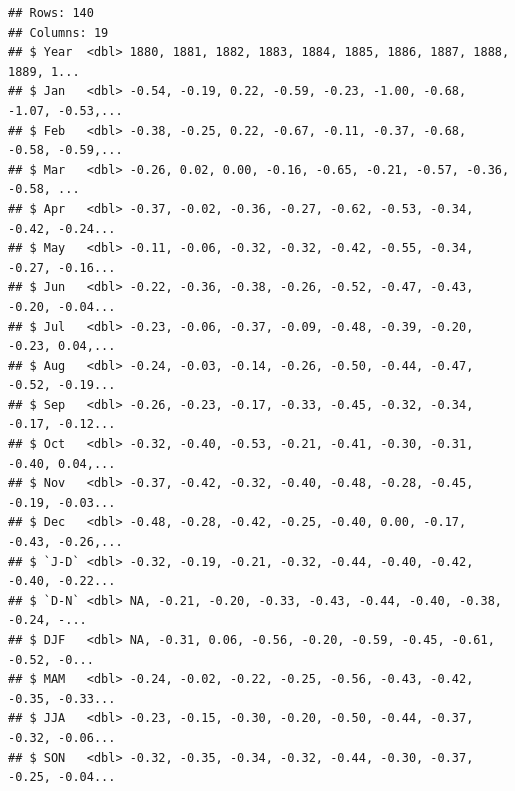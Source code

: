 \documentclass[
]{article}
\newenvironment{Shaded}{\begin{snugshade}}{\end{snugshade}}
\newcommand{\CommentTok}[1]{\textcolor[rgb]{0.56,0.35,0.01}{\textit{#1}}}
\newcommand{\DataTypeTok}[1]{\textcolor[rgb]{0.13,0.29,0.53}{#1}}
\newcommand{\DecValTok}[1]{\textcolor[rgb]{0.00,0.00,0.81}{#1}}
\newcommand{\KeywordTok}[1]{\textcolor[rgb]{0.13,0.29,0.53}{\textbf{#1}}}
\newcommand{\NormalTok}[1]{#1}
\newcommand{\OperatorTok}[1]{\textcolor[rgb]{0.81,0.36,0.00}{\textbf{#1}}}
\newcommand{\StringTok}[1]{\textcolor[rgb]{0.31,0.60,0.02}{#1}}
\begin{document}
\begin{verbatim}
## Rows: 140
## Columns: 19
## $ Year  <dbl> 1880, 1881, 1882, 1883, 1884, 1885, 1886, 1887, 1888, 1889, 1...
## $ Jan   <dbl> -0.54, -0.19, 0.22, -0.59, -0.23, -1.00, -0.68, -1.07, -0.53,...
## $ Feb   <dbl> -0.38, -0.25, 0.22, -0.67, -0.11, -0.37, -0.68, -0.58, -0.59,...
## $ Mar   <dbl> -0.26, 0.02, 0.00, -0.16, -0.65, -0.21, -0.57, -0.36, -0.58, ...
## $ Apr   <dbl> -0.37, -0.02, -0.36, -0.27, -0.62, -0.53, -0.34, -0.42, -0.24...
## $ May   <dbl> -0.11, -0.06, -0.32, -0.32, -0.42, -0.55, -0.34, -0.27, -0.16...
## $ Jun   <dbl> -0.22, -0.36, -0.38, -0.26, -0.52, -0.47, -0.43, -0.20, -0.04...
## $ Jul   <dbl> -0.23, -0.06, -0.37, -0.09, -0.48, -0.39, -0.20, -0.23, 0.04,...
## $ Aug   <dbl> -0.24, -0.03, -0.14, -0.26, -0.50, -0.44, -0.47, -0.52, -0.19...
## $ Sep   <dbl> -0.26, -0.23, -0.17, -0.33, -0.45, -0.32, -0.34, -0.17, -0.12...
## $ Oct   <dbl> -0.32, -0.40, -0.53, -0.21, -0.41, -0.30, -0.31, -0.40, 0.04,...
## $ Nov   <dbl> -0.37, -0.42, -0.32, -0.40, -0.48, -0.28, -0.45, -0.19, -0.03...
## $ Dec   <dbl> -0.48, -0.28, -0.42, -0.25, -0.40, 0.00, -0.17, -0.43, -0.26,...
## $ `J-D` <dbl> -0.32, -0.19, -0.21, -0.32, -0.44, -0.40, -0.42, -0.40, -0.22...
## $ `D-N` <dbl> NA, -0.21, -0.20, -0.33, -0.43, -0.44, -0.40, -0.38, -0.24, -...
## $ DJF   <dbl> NA, -0.31, 0.06, -0.56, -0.20, -0.59, -0.45, -0.61, -0.52, -0...
## $ MAM   <dbl> -0.24, -0.02, -0.22, -0.25, -0.56, -0.43, -0.42, -0.35, -0.33...
## $ JJA   <dbl> -0.23, -0.15, -0.30, -0.20, -0.50, -0.44, -0.37, -0.32, -0.06...
## $ SON   <dbl> -0.32, -0.35, -0.34, -0.32, -0.44, -0.30, -0.37, -0.25, -0.04...
\end{verbatim}

\begin{Shaded}
\end{Shaded}
\end{document}
